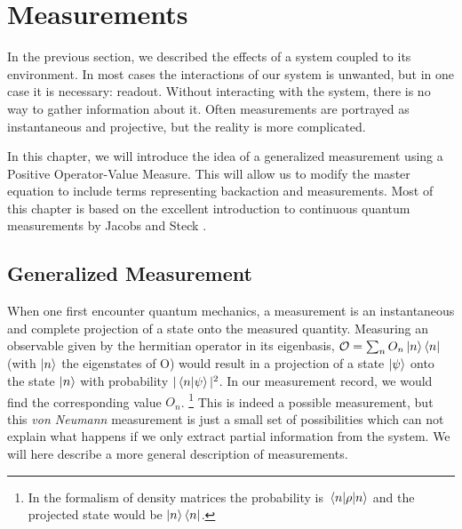 \chapter{Measurements}\label{chap:measurements}
In the previous section, we described the effects of a system coupled to its environment. In most cases the interactions of our system is unwanted, but in one case it is necessary: readout. Without interacting with the system, there is no way to gather information about it. Often measurements are portrayed as instantaneous and projective, but the reality is more complicated. 

In this chapter, we will introduce the idea of a generalized measurement using a Positive Operator-Value Measure. This will allow us to modify the master equation to include terms representing backaction and measurements. Most of this chapter is based on the excellent introduction to continuous quantum measurements by Jacobs and Steck \cite{jacobs_straightforward_2006}.

\section{Generalized Measurement}
When one first encounter quantum mechanics, a measurement is an instantaneous and complete projection of a state onto the measured quantity. Measuring an observable given by the hermitian operator in its eigenbasis, $\mathcal{O} = \sum_n O_n \ket{n}\bra{n}$ (with $\ket{n}$ the eigenstates of O) would result in a projection of a state $\ket{\psi}$ onto the state $\ket{n}$ with probability $|\braket{n}{\psi}|^2$. In our measurement record, we would find the corresponding value $O_n$. \footnote{In the formalism of density matrices the probability is $\mel{n}{\rho}{n}$ and the projected state would be $\ket{n}\bra{n}$.} This is indeed a possible measurement, but this \textit{von Neumann} measurement is just a small set of possibilities which can not explain what happens if we only extract partial information from the system. We will here describe a more general description of measurements. 

